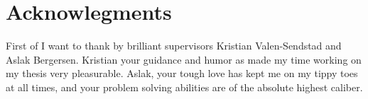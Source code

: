 \section*{Acknowlegments}
First of I want to thank by brilliant supervisors Kristian Valen-Sendstad and Aslak Bergersen. Kristian your guidance and humor as made my time working on my thesis very pleasurable. Aslak, your tough love has kept me on my tippy toes at all times, and your problem solving abilities are of the absolute highest caliber. 											